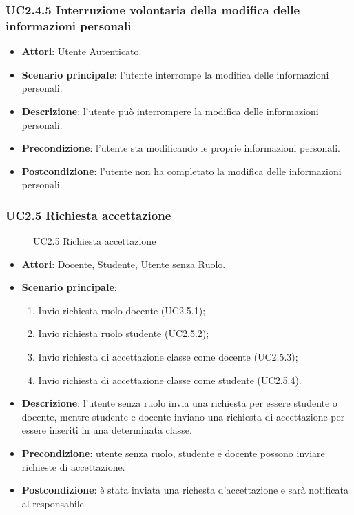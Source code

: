 \subsubsection{UC2.4.5 Interruzione volontaria della modifica delle informazioni personali}
\begin{itemize}
\item \textbf{Attori}: Utente Autenticato.
\item \textbf{Scenario principale}: l'utente interrompe la modifica delle informazioni personali.
\item \textbf{Descrizione}: l'utente può interrompere la modifica delle informazioni personali.
\item \textbf{Precondizione}: l'utente sta modificando le proprie informazioni personali.
\item \textbf{Postcondizione}: l'utente non ha completato la modifica delle informazioni personali.
\end{itemize}
\subsubsection{UC2.5 Richiesta accettazione}
\begin{figure}[H]
\centering
\noindent{}
\caption{UC2.5 Richiesta accettazione}
\end{figure}
\begin{itemize}
\item \textbf{Attori}: Docente, Studente, Utente senza Ruolo.
\item \textbf{Scenario principale}:
\begin{enumerate}
\item Invio richiesta ruolo docente (UC2.5.1);
\item Invio richiesta ruolo studente (UC2.5.2);
\item Invio richiesta di accettazione classe come docente (UC2.5.3);
\item Invio richiesta di accettazione classe come studente (UC2.5.4).
\end{enumerate}
\item \textbf{Descrizione}: l’utente senza ruolo invia una richiesta per essere studente o docente, mentre studente e docente inviano una richiesta di accettazione per essere inseriti in una determinata classe.
\item \textbf{Precondizione}: utente senza ruolo, studente e docente possono inviare richieste di accettazione.
\item \textbf{Postcondizione}: è stata inviata una richesta d’accettazione e sarà notificata al responsabile.
\end{itemize}
